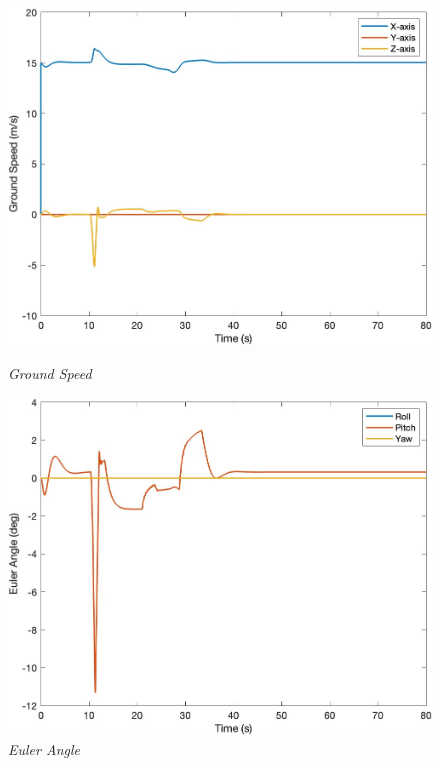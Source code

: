 \begin{figure}[htbp]
  \begin{minipage}[b]{0.45\textwidth}
    \centering
    \includegraphics[width=\textwidth]{Images/Gust/Gust FWD pulse 0428/3 groundspeed_4.jpg}
    \caption*{\textit{Ground Speed}}
  \end{minipage}
  \hfil
  \begin{minipage}[b]{0.45\textwidth}
    \centering
    \includegraphics[width=\textwidth]{Images/Gust/Gust FWD pulse 0428/4 EulerAngle_4.jpg}
    \caption*{\textit{Euler Angle}}
  \end{minipage}
  \begin{minipage}[b]{0.45\textwidth}

\end{minipage}
\end{figure}
